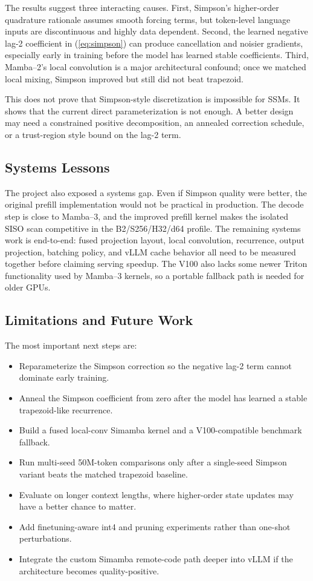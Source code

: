 \documentclass[conference]{IEEEtran}
\newcommand{\modelname}{Simamba\xspace}
\newcommand{\mambatwo}{Mamba--2\xspace}
\newcommand{\mambathree}{Mamba--3\xspace}
\begin{document}
The results suggest three interacting causes. First, Simpson's higher-order quadrature rationale assumes smooth forcing terms, but token-level language inputs are discontinuous and highly data dependent. Second, the learned negative lag-2 coefficient in (\ref{eq:simpson}) can produce cancellation and noisier gradients, especially early in training before the model has learned stable coefficients. Third, \mambatwo's local convolution is a major architectural confound; once we matched local mixing, Simpson improved but still did not beat trapezoid.

This does not prove that Simpson-style discretization is impossible for SSMs. It shows that the current direct parameterization is not enough. A better design may need a constrained positive decomposition, an annealed correction schedule, or a trust-region style bound on the lag-2 term.

\subsection{Systems Lessons}

The project also exposed a systems gap. Even if Simpson quality were better, the original prefill implementation would not be practical in production. The decode step is close to \mambathree, and the improved prefill kernel makes the isolated SISO scan competitive in the B2/S256/H32/d64 profile. The remaining systems work is end-to-end: fused projection layout, local convolution, recurrence, output projection, batching policy, and vLLM cache behavior all need to be measured together before claiming serving speedup. The V100 also lacks some newer Triton functionality used by \mambathree kernels, so a portable fallback path is needed for older GPUs.

\subsection{Limitations and Future Work}

The most important next steps are:
\begin{itemize}
    \item Reparameterize the Simpson correction so the negative lag-2 term cannot dominate early training.
    \item Anneal the Simpson coefficient from zero after the model has learned a stable trapezoid-like recurrence.
    \item Build a fused local-conv \modelname kernel and a V100-compatible benchmark fallback.
    \item Run multi-seed 50M-token comparisons only after a single-seed Simpson variant beats the matched trapezoid baseline.
    \item Evaluate on longer context lengths, where higher-order state updates may have a better chance to matter.
    \item Add finetuning-aware int4 and pruning experiments rather than one-shot perturbations.
    \item Integrate the custom \modelname remote-code path deeper into vLLM if the architecture becomes quality-positive.
\end{itemize}
\end{document}
